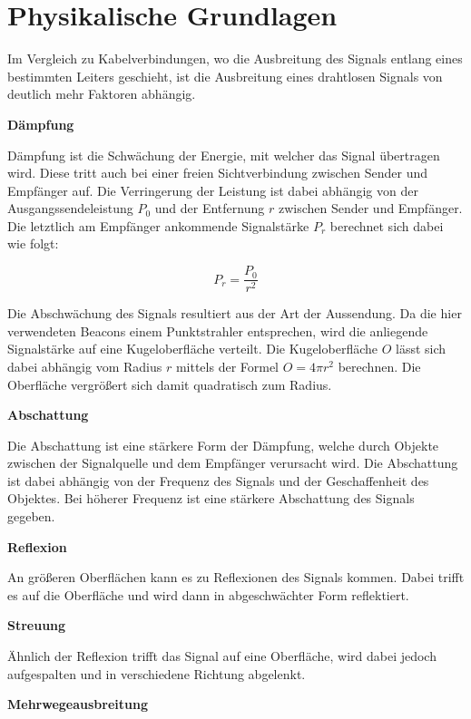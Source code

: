 \section{Physikalische Grundlagen}
\label{sec:dataandmeasurement:physics}
Im Vergleich zu Kabelverbindungen, wo die Ausbreitung des Signals entlang eines bestimmten Leiters geschieht, ist die Ausbreitung eines drahtlosen Signals von deutlich mehr Faktoren abhängig.

\textbf{Dämpfung}

Dämpfung ist die Schwächung der Energie, mit welcher das Signal übertragen wird. Diese tritt auch bei einer freien Sichtverbindung zwischen Sender und Empfänger auf. Die Verringerung der Leistung ist dabei abhängig von der Ausgangssendeleistung $P_0$ und der Entfernung $r$ zwischen Sender und Empfänger. Die letztlich am Empfänger ankommende Signalstärke $P_r$ berechnet sich dabei wie folgt:

\begin{equation}
	P_r = \frac{P_0}{r^{2}} 
\end{equation}

Die Abschwächung des Signals resultiert aus der Art der Aussendung. Da die hier verwendeten Beacons einem Punktstrahler entsprechen, wird die anliegende Signalstärke auf eine Kugeloberfläche verteilt. Die Kugeloberfläche $O$ lässt sich dabei abhängig vom Radius $r$ mittels der Formel $O = 4 \pi r^{2}$ berechnen. Die Oberfläche vergrößert sich damit quadratisch zum Radius.

\textbf{Abschattung}

Die Abschattung ist eine stärkere Form der Dämpfung, welche durch Objekte zwischen der Signalquelle und dem Empfänger verursacht wird. Die Abschattung ist dabei abhängig von der Frequenz des Signals und der Geschaffenheit des Objektes. Bei höherer Frequenz ist eine stärkere Abschattung des Signals gegeben.

\textbf{Reflexion}

An größeren Oberflächen kann es zu Reflexionen des Signals kommen. Dabei trifft es auf die Oberfläche und wird dann in abgeschwächter Form reflektiert.

\textbf{Streuung}

Ähnlich der Reflexion trifft das Signal auf eine Oberfläche, wird dabei jedoch aufgespalten und in verschiedene Richtung abgelenkt.

\textbf{Mehrwegeausbreitung}

